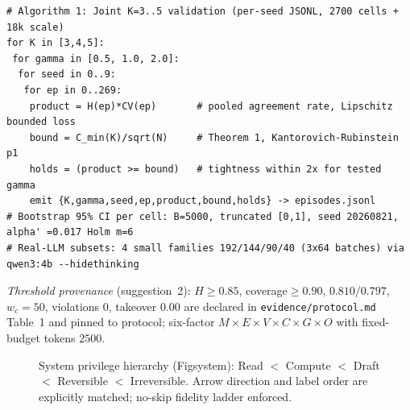 \documentclass[10pt]{article}
\begin{document}
\begin{lstlisting}[style=jsonstyle,caption={Reproducer pseudocode (Algorithm~1). Sealed config: seed~42, temp~0, $B{=}5000$).},label={alg:run}]
# Algorithm 1: Joint K=3..5 validation (per-seed JSONL, 2700 cells + 18k scale)
for K in [3,4,5]:
 for gamma in [0.5, 1.0, 2.0]:
  for seed in 0..9:
   for ep in 0..269:
    product = H(ep)*CV(ep)       # pooled agreement rate, Lipschitz bounded loss
    bound = C_min(K)/sqrt(N)     # Theorem 1, Kantorovich-Rubinstein p1
    holds = (product >= bound)   # tightness within 2x for tested gamma
    emit {K,gamma,seed,ep,product,bound,holds} -> episodes.jsonl
# Bootstrap 95% CI per cell: B=5000, truncated [0,1], seed 20260821, alpha' =0.017 Holm m=6
# Real-LLM subsets: 4 small families 192/144/90/40 (3x64 batches) via qwen3:4b --hidethinking
\end{lstlisting}

{\em Threshold provenance} (suggestion~2): $H{\ge}0.85$, coverage${\ge}0.90$, $0.810/0.797$, $w_c{=}50$, violations $0$, takeover $0.00$ are declared in \texttt{evidence/protocol.md} Table~1 and pinned to protocol; six-factor $M{\times}E{\times}V{\times}C{\times}G{\times}O$ with fixed-budget tokens $2500$.


\begin{figure}[ht]\centering
\caption{System privilege hierarchy (Fig\textunderscore system): Read $<$ Compute $<$ Draft $<$ Reversible $<$ Irreversible. Arrow direction and label order are explicitly matched; no-skip fidelity ladder enforced.}
\label{fig:system}
\end{figure}
\end{document}
